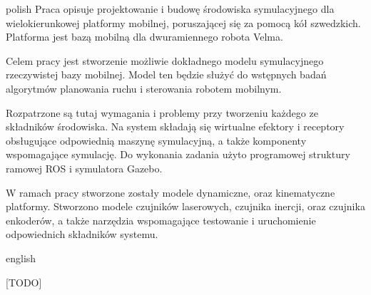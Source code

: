  \begin{abstractpage}
	\begin{abstractsection}{polish}
		Praca opisuje projektowanie i budowę środowiska symulacyjnego dla wielokierunkowej platformy mobilnej, poruszającej się za pomocą kół szwedzkich.
		Platforma jest bazą mobilną dla dwuramiennego robota Velma. 
		
		Celem pracy jest stworzenie możliwie dokładnego modelu symulacyjnego rzeczywistej bazy mobilnej.
		Model ten będzie służyć do wstępnych badań algorytmów planowania ruchu i sterowania robotem mobilnym.

		Rozpatrzone są tutaj wymagania i problemy przy tworzeniu każdego ze składników środowiska.
		Na system składają się wirtualne efektory i receptory obsługujące odpowiednią maszynę symulacyjną, a także komponenty wspomagające symulację.
		Do wykonania zadania użyto programowej struktury ramowej ROS i symulatora Gazebo.
		
		W ramach pracy stworzone zostały modele dynamiczne, oraz kinematyczne platformy.
		Stworzono modele czujników laserowych, czujnika inercji, oraz czujnika enkoderów, a także narzędzia wspomagające testowanie i uruchomienie odpowiednich składników systemu.
	\end{abstractsection}

	\begin{abstractsection}{english}
		
	
		[TODO]
		
	\end{abstractsection}
\end{abstractpage}
